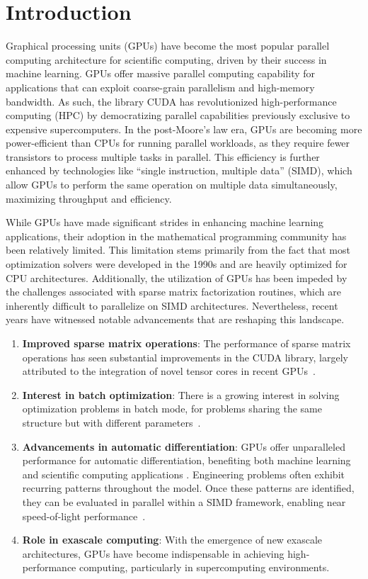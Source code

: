 \section{Introduction}
Graphical processing units (GPUs) have become the most popular parallel computing architecture
for scientific computing, driven by their success in machine learning.
GPUs offer massive parallel computing capability for applications
that can exploit coarse-grain parallelism and high-memory bandwidth.
As such, the library CUDA has revolutionized high-performance computing (HPC) by democratizing parallel capabilities previously exclusive to expensive supercomputers.
In the post-Moore's law era, GPUs are becoming more power-efficient than CPUs for running parallel workloads, as they require fewer transistors to process multiple tasks in parallel.
This efficiency is further enhanced by technologies like ``single instruction, multiple data'' (SIMD), which allow GPUs to perform the same operation on multiple data simultaneously, maximizing throughput and efficiency.

While GPUs have made significant strides in enhancing machine learning applications, their adoption in the mathematical programming community has been relatively limited.
This limitation stems primarily from the fact that most optimization solvers were developed in the 1990s and are heavily optimized for CPU architectures.
Additionally, the utilization of GPUs has been impeded by the challenges associated with sparse matrix factorization routines, which are inherently difficult to parallelize on SIMD architectures. Nevertheless, recent years have witnessed notable advancements that are reshaping this landscape.

\begin{enumerate}
  \item \textbf{Improved sparse matrix operations}: The performance of sparse matrix operations has seen substantial improvements in the CUDA library, largely attributed to the integration of novel tensor cores in recent GPUs~\cite{markidis2018nvidia}.
  \item \textbf{Interest in batch optimization}: There is a growing interest in solving optimization problems in batch mode, for problems sharing the same structure but with different parameters~\cite{amos2017optnet,pineda2022theseus}.
  \item \textbf{Advancements in automatic differentiation}: GPUs offer unparalleled performance for automatic differentiation, benefiting both machine learning ~\cite{jax2018github} and scientific computing applications \cite{enzyme2021}. Engineering problems often exhibit recurring patterns throughout the model. Once these patterns are identified, they can be evaluated in parallel within a SIMD framework, enabling near speed-of-light performance~\cite{shin2023accelerating}.
  \item \textbf{Role in exascale computing}: With the emergence of new exascale architectures, GPUs have become indispensable in achieving high-performance computing, particularly in supercomputing environments.
\end{enumerate}


